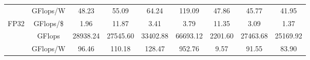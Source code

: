 \begin{table}[h]
\begin{adjustwidth}{-1.5in}{-1.5in}
\begin{center}
{\begin{tabular}{cc||c|c|c|c|c|c|c}
                                  & GFlops/W                                                                               & 48.23                                                           & 55.09                                                            & 64.24                                                                & 119.09                                                        & 47.86                                                                & 45.77                                                                  & 41.95                                                                  \\
\multirow{-3}{*}{FP32}            & \cellcolor[HTML]{EFEFEF}GFlops/\$                                                      & \cellcolor[HTML]{EFEFEF}1.96                                    & \cellcolor[HTML]{EFEFEF}11.87                                    & \cellcolor[HTML]{EFEFEF}3.41                                         & \cellcolor[HTML]{EFEFEF}3.79                                  & \cellcolor[HTML]{EFEFEF}11.35                                        & \cellcolor[HTML]{EFEFEF}3.09                                           & \cellcolor[HTML]{EFEFEF}1.37                                           \\ \hline
                                  & GFlops                                                                                 & 28938.24                                                        & 27545.60                                                         & 33402.88                                                             & 66693.12                                                      & 2201.60                                                              & 27463.68                                                               & 25169.92                                                               \\
                                  & \cellcolor[HTML]{EFEFEF}GFlops/W                                                       & \cellcolor[HTML]{EFEFEF}96.46                                   & \cellcolor[HTML]{EFEFEF}110.18                                   & \cellcolor[HTML]{EFEFEF}128.47                                       & \cellcolor[HTML]{EFEFEF}952.76                                & \cellcolor[HTML]{EFEFEF}9.57                                         & \cellcolor[HTML]{EFEFEF}91.55                                          & \cellcolor[HTML]{EFEFEF}83.90                                          \\

\end{tabular}}
\end{center}
\end{adjustwidth}
\end{table}
